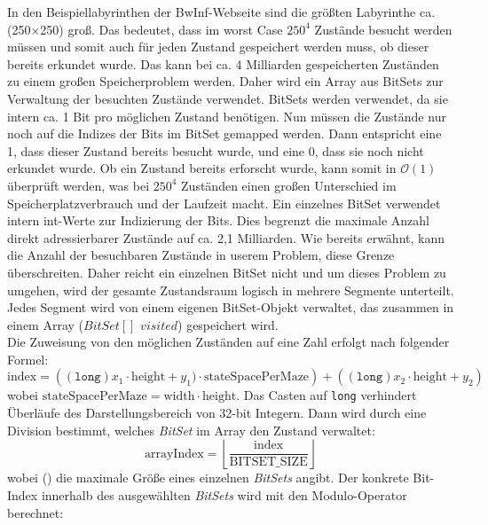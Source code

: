 \documentclass[a4paper,10pt,ngerman]{scrartcl}
\begin{document}
\begin{enumerate}
\begin{enumerate}
        In den Beispiellabyrinthen der BwInf-Webseite sind die größten Labyrinthe ca. (250×250) groß. Das bedeutet, dass im worst Case $250^{4}$ Zustände besucht werden müssen und somit auch für jeden Zustand gespeichert werden muss, ob dieser bereits erkundet wurde. Das kann bei ca. 4 Milliarden gespeicherten Zuständen zu einem großen Speicherproblem werden. Daher wird ein Array aus BitSets zur Verwaltung der besuchten Zustände verwendet. BitSets werden verwendet, da sie intern ca. 1 Bit pro möglichen Zustand benötigen. Nun müssen die Zustände nur noch auf die Indizes der Bits im BitSet gemapped werden. Dann entspricht eine 1, dass dieser Zustand bereits besucht wurde, und eine 0, dass sie noch nicht erkundet wurde. Ob ein Zustand bereits erforscht wurde, kann somit in $\mathcal{O}(1)$ überprüft werden, was bei $250^{4}$ Zuständen einen großen Unterschied im Speicherplatzverbrauch und der Laufzeit macht. Ein einzelnes BitSet verwendet intern int-Werte zur Indizierung der Bits. Dies begrenzt die maximale Anzahl direkt adressierbarer Zustände auf ca. 2,1 Milliarden. Wie bereits erwähnt, kann die Anzahl der besuchbaren Zustände in userem Problem, diese Grenze überschreiten. Daher reicht ein einzelnen BitSet nicht und um dieses Problem zu umgehen, wird der gesamte Zustandsraum logisch in mehrere Segmente unterteilt. Jedes Segment wird von einem eigenen BitSet-Objekt verwaltet, das zusammen in einem Array ($BitSet[]$ $visited$) gespeichert wird. 
        \\
        Die Zuweisung von den möglichen Zuständen auf eine Zahl erfolgt nach folgender Formel:
        \begin{equation}
          \text{index} = \left( (\texttt{long}) x_1 \cdot \text{height} + y_1) \cdot \text{stateSpacePerMaze} \right) + ((\texttt{long}) x_2 \cdot \text{height} + y_2)
  \label{3}
        \end{equation}
        wobei $\text{stateSpacePerMaze} = \text{width} \cdot \text{height}.$ Das Casten auf \texttt{long} verhindert Überläufe des Darstellungsbereich von 32-bit Integern. Dann wird durch eine Division bestimmt, welches \textit{BitSet} im Array den Zustand verwaltet:
        \begin{equation}
          \text{arrayIndex} = \left\lfloor \frac{\text{index}}{\text{BITSET\_SIZE}} \right\rfloor
  \label{4}
        \end{equation}
        wobei () die maximale Größe eines einzelnen \textit{BitSets} angibt. 
        Der konkrete Bit-Index innerhalb des ausgewählten \textit{BitSets} wird mit den Modulo-Operator berechnet: 

\end{enumerate}
\end{enumerate}
\end{document}

